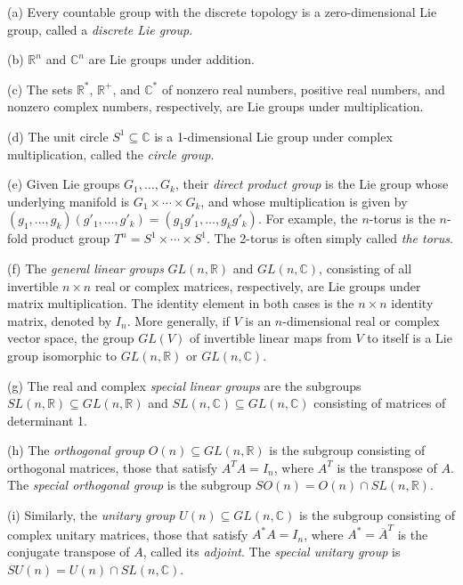 \begin{example}
\label{ex:lie-group-examples}

(a) Every countable group with the discrete topology is a zero-dimensional Lie group, called a \emph{discrete Lie group}.

(b) $\mathbb{R}^n$ and $\mathbb{C}^n$ are Lie groups under addition.

(c) The sets $\mathbb{R}^*$, $\mathbb{R}^+$, and $\mathbb{C}^*$ of nonzero real numbers, positive real numbers, and nonzero complex numbers, respectively, are Lie groups under multiplication.

(d) The unit circle $S^1 \subseteq \mathbb{C}$ is a 1-dimensional Lie group under complex multiplication, called the \emph{circle group}.

(e) Given Lie groups $G_1, \ldots, G_k$, their \emph{direct product group} is the Lie group whose underlying manifold is $G_1 \times \cdots \times G_k$, and whose multiplication is given by $(g_1, \ldots, g_k)(g'_1, \ldots, g'_k) = (g_1 g'_1, \ldots, g_k g'_k)$. For example, the $n$-torus is the $n$-fold product group $T^n = S^1 \times \cdots \times S^1$. The 2-torus is often simply called \emph{the torus}.

(f) The \emph{general linear groups} $GL(n, \mathbb{R})$ and $GL(n, \mathbb{C})$, consisting of all invertible $n \times n$ real or complex matrices, respectively, are Lie groups under matrix multiplication. The identity element in both cases is the $n \times n$ identity matrix, denoted by $I_n$. More generally, if $V$ is an $n$-dimensional real or complex vector space, the group $GL(V)$ of invertible linear maps from $V$ to itself is a Lie group isomorphic to $GL(n, \mathbb{R})$ or $GL(n, \mathbb{C})$.

(g) The real and complex \emph{special linear groups} are the subgroups $SL(n, \mathbb{R}) \subseteq GL(n, \mathbb{R})$ and $SL(n, \mathbb{C}) \subseteq GL(n, \mathbb{C})$ consisting of matrices of determinant 1.

(h) The \emph{orthogonal group} $O(n) \subseteq GL(n, \mathbb{R})$ is the subgroup consisting of orthogonal matrices, those that satisfy $A^T A = I_n$, where $A^T$ is the transpose of $A$. The \emph{special orthogonal group} is the subgroup $SO(n) = O(n) \cap SL(n, \mathbb{R})$.

(i) Similarly, the \emph{unitary group} $U(n) \subseteq GL(n, \mathbb{C})$ is the subgroup consisting of complex unitary matrices, those that satisfy $A^* A = I_n$, where $A^* = \overline{A}^T$ is the conjugate transpose of $A$, called its \emph{adjoint}. The \emph{special unitary group} is $SU(n) = U(n) \cap SL(n, \mathbb{C})$.
\end{example}

